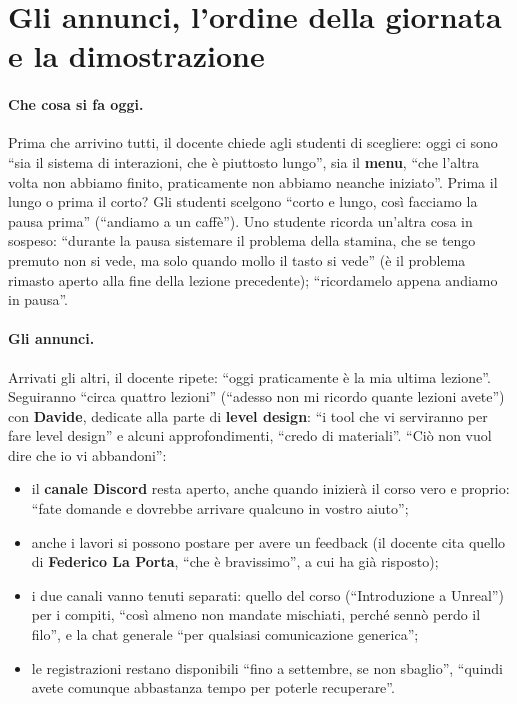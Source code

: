 \section{Gli annunci, l'ordine della giornata e la dimostrazione}
\label{ue12:sec:annunci}

\paragraph{Che cosa si fa oggi.} Prima che arrivino tutti, il docente chiede agli
studenti di scegliere: oggi ci sono ``sia il sistema di interazioni, che è piuttosto
lungo'', sia il \textbf{menu}, ``che l'altra volta non abbiamo finito, praticamente non
abbiamo neanche iniziato''. Prima il lungo o prima il corto? Gli studenti scelgono
``corto e lungo, così facciamo la pausa prima'' (``andiamo a un caffè''). Uno studente
ricorda un'altra cosa in sospeso: ``durante la pausa sistemare il problema della stamina,
che se tengo premuto non si vede, ma solo quando mollo il tasto si vede'' (è il problema
rimasto aperto alla fine della lezione precedente); ``ricordamelo appena andiamo in
pausa''.

\paragraph{Gli annunci.} Arrivati gli altri, il docente ripete: ``oggi praticamente è la
mia ultima lezione''. Seguiranno ``circa quattro lezioni'' (``adesso non mi ricordo quante
lezioni avete'') con \textbf{Davide}, dedicate alla parte di \textbf{level design}: ``i
tool che vi serviranno per fare level design'' e alcuni approfondimenti, ``credo di
materiali''. ``Ciò non vuol dire che io vi abbandoni'':
\begin{itemize}
  \item il \textbf{canale Discord} resta aperto, anche quando inizierà il corso vero e
        proprio: ``fate domande e dovrebbe arrivare qualcuno in vostro aiuto'';
  \item anche i lavori si possono postare per avere un feedback (il docente cita quello
        di \textbf{Federico La Porta}, ``che è bravissimo'', a cui ha già risposto);
  \item i due canali vanno tenuti separati: quello del corso (``Introduzione a Unreal'')
        per i compiti, ``così almeno non mandate mischiati, perché sennò perdo il filo'',
        e la chat generale ``per qualsiasi comunicazione generica'';
  \item le registrazioni restano disponibili ``fino a settembre, se non sbaglio'', ``quindi
        avete comunque abbastanza tempo per poterle recuperare''.
\end{itemize}

